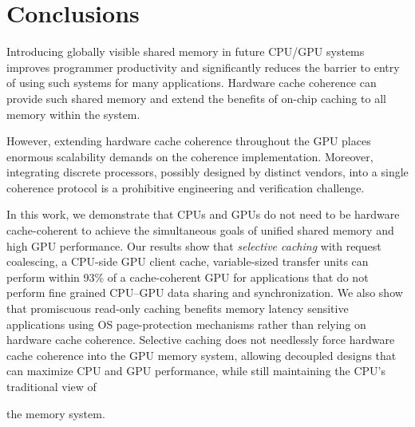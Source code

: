 \section{Conclusions}
\label{conclusions}
Introducing globally visible shared memory in future CPU/GPU systems
improves programmer productivity and significantly reduces the barrier
to entry of using such systems for many applications. 
Hardware cache coherence can provide such shared memory and
extend the benefits of on-chip caching to all memory within the system.
  However, extending hardware cache coherence 
throughout the GPU places enormous
scalability demands on the coherence implementation.  Moreover, integrating
discrete processors, possibly designed by distinct vendors,
into a single coherence protocol is a prohibitive engineering and
verification challenge.  

In this work, we demonstrate that CPUs and
GPUs do not need to be hardware cache-coherent to achieve the
simultaneous goals of unified shared memory and high GPU performance.  Our
results show that \textit{selective caching} with request coalescing,
a CPU-side GPU client cache, variable-sized transfer units
can perform within 93\% of a
cache-coherent GPU for applications that do not perform fine
grained CPU--GPU data sharing and synchronization. We also show that promiscuous
read-only caching benefits memory latency sensitive applications using
OS page-protection mechanisms rather than relying on hardware cache coherence.  Selective caching
does not needlessly force hardware cache coherence into the GPU memory system,
allowing decoupled designs that can maximize CPU and GPU performance, while
still maintaining the CPU's traditional view of the
memory system.\newpage
